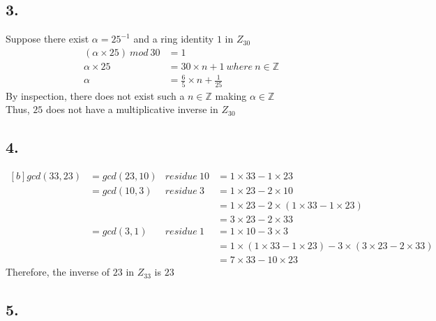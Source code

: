 \documentclass[11pt]{article}
\begin{document}
\subsection*{3.}
Suppose there exist $\alpha=25^{-1}$ and a ring identity $1$ in $Z_{30}$
\begin{equation}
\begin{split}
(\alpha\times25)\ mod\ 30&= 1\\
\alpha\times25&=30\times n+1\ where\ n\in\mathbb{Z}\\
\alpha&=\frac{6}{5}\times n + \frac{1}{25} 
\end{split}
\end{equation}
By inspection, there does not exist such a $n\in\mathbb{Z}$ making $\alpha\in\mathbb{Z}$\\
Thus, $25$ does not have a multiplicative inverse in $Z_{30}$

\subsection*{4.}
\begin{equation}
\begin{aligned}[b]
gcd(33,23)	&=gcd(23,10)	&residue\ 10&= 1\times 33-1\times 23\\
		  	&=gcd(10,3)		&residue\  3&= 1\times 23-2\times 10\\
		  	&				&			&= 1\times 23-2\times (1\times 33-1\times 23)\\
		  	&				&			&= 3\times 23-2\times 33\\
		  	&=gcd(3,1)		&residue\  1&= 1\times 10-3\times 3\\
		  	&				&			&= 1\times(1\times 33-1\times 23)-3\times(3\times 23-2\times 33)\\
		  	&				&			&= 7\times 33-10\times 23
\end{aligned}
\end{equation}
Therefore, the inverse of $23$ in $Z_{33}$ is $23$
\subsection*{5.}
\end{document}
